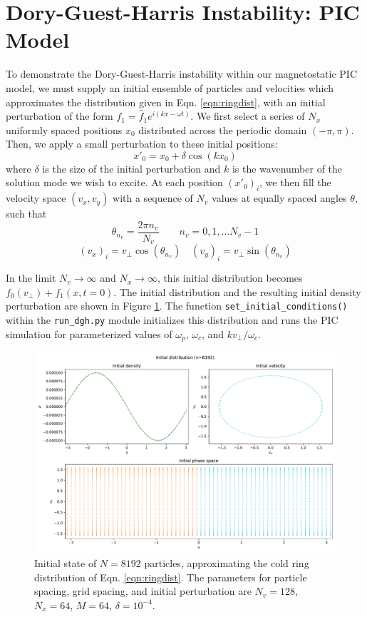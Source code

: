 \documentclass[%
 reprint,
 amsmath,amssymb,
 aps,
]{revtex4-2}
\begin{document}
\section{Dory-Guest-Harris Instability: PIC Model}

To demonstrate the Dory-Guest-Harris instability within our magnetostatic PIC model, we must supply an initial ensemble of particles and velocities which approximates the distribution given in Eqn. \ref{eqn:ringdist}, with an initial perturbation of the form $f_1 = \hat f_1 e^{i (k x - \omega t)}$. We first select a series of $N_x$ uniformly spaced positions $x_0$ distributed across the periodic domain $(-\pi, \pi)$. Then, we apply a small perturbation to these initial positions:
\begin{equation}
x'_0 = x_0 + \delta \cos(k x_0)
\end{equation}
where $\delta$ is the size of the initial perturbation and $k$ is the wavenumber of the solution mode we wish to excite. At each position $(x'_0)_i$, we then fill the velocity space $(v_x, v_y)$ with a sequence of $N_v$ values at equally spaced angles $\theta$, such that
\begin{equation}
\theta_{n_v} = \frac{2 \pi n_v}{N_v} \qquad n_v = 0, 1, \ldots N_v - 1 
\end{equation}
\begin{equation}
(v_x)_i = v_\perp \cos (\theta_{n_v}) \quad (v_y)_i = v_\perp \sin (\theta_{n_v})
\end{equation}

In the limit $N_v \rightarrow \infty$ and $N_x \rightarrow \infty$, this initial distribution becomes $f_0(v_\perp) + f_1(x, t=0)$. The initial distribution and the resulting initial density perturbation are shown in Figure \ref{fig:dgh-initial-distribution}. The function \texttt{set\_initial\_conditions()} within the \texttt{run\_dgh.py} module initializes this distribution and runs the PIC simulation for parameterized values of $\omega_p$, $\omega_c$, and $k v_\perp / \omega_c$.

\begin{figure}
\includegraphics[width=0.9\linewidth]{proj4/initial_hist_8192_particles.pdf}
\caption{\label{fig:dgh-initial-distribution}Initial state of $N = 8192$ particles, approximating the cold ring distribution of Eqn. \ref{eqn:ringdist}. The parameters for particle spacing, grid spacing, and initial perturbation are $N_v = 128$, $N_x = 64$, $M = 64$, $\delta = 10^{-4}$.}
\end{figure}
\end{document}
